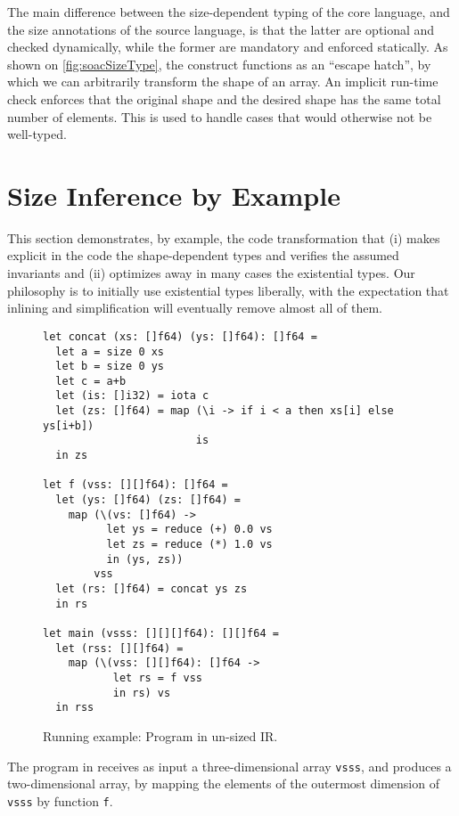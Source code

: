 The main difference between the size-dependent typing of the core
language, and the size annotations of the source language, is that the
latter are optional and checked dynamically, while the former are
mandatory and enforced statically.  As shown on
\cref{fig:soacSizeType}, the  construct functions as an
``escape hatch'', by which we can arbitrarily transform the shape of
an array.  An implicit run-time check enforces that the original shape
and the desired shape has the same total number of elements.  This is
used to handle cases that would otherwise not be well-typed.

\section{Size Inference by Example}
\label{sec:size-analysis-intuition}

This section demonstrates, by example, the code transformation that
(i) makes explicit in the code the shape-dependent types and verifies
the assumed invariants and (ii) optimizes away in many cases the
existential types.  Our philosophy is to initially use existential
types liberally, with the expectation that inlining and simplification
will eventually remove almost all of them.

\begin{figure}
\begin{lstlisting}
let concat (xs: []f64) (ys: []f64): []f64 =
  let a = size 0 xs
  let b = size 0 ys
  let c = a+b
  let (is: []i32) = iota c
  let (zs: []f64) = map (\i -> if i < a then xs[i] else ys[i+b])
                        is
  in zs

let f (vss: [][]f64): []f64 =
  let (ys: []f64) (zs: []f64) =
    map (\(vs: []f64) ->
          let ys = reduce (+) 0.0 vs
          let zs = reduce (*) 1.0 vs
          in (ys, zs))
        vss
  let (rs: []f64) = concat ys zs
  in rs

let main (vsss: [][][]f64): [][]f64 =
  let (rss: [][]f64) =
    map (\(vss: [][]f64): []f64 ->
           let rs = f vss
           in rs) vs
  in rss
\end{lstlisting}

\caption{Running example: Program in un-sized IR.} 
\label{fig:RunEgSrc}
\end{figure}

The program in  receives as input a
three-dimensional array \texttt{vsss}, and produces a two-dimensional
array, by mapping the elements of the outermost dimension of
\texttt{vsss} by function \texttt{f}.

